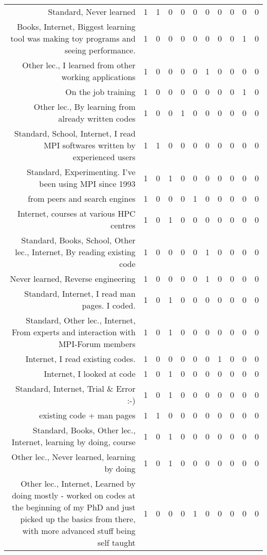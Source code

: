 {\begin{landscape}
\begin{longtable}[htb]{r|c|c|c|c|c|c|c|c|c|c}
{Standard, Never learned} & 1 & 1 & 0 & 0 & 0 & 0 & 0 & 0 & 0 & 0 \\%
{Books, Internet, Biggest learning tool was making toy programs and seeing performance.} & 1 & 0 & 0 & 0 & 0 & 0 & 0 & 0 & 1 & 0 \\%
{Other lec., I learned from other working applications} & 1 & 0 & 0 & 0 & 0 & 1 & 0 & 0 & 0 & 0 \\%
{On the job training} & 1 & 0 & 0 & 0 & 0 & 0 & 0 & 0 & 1 & 0 \\%
{Other lec., By learning from already written codes} & 1 & 0 & 0 & 1 & 0 & 0 & 0 & 0 & 0 & 0 \\%
{Standard, School, Internet, I read MPI softwares written by experienced users} & 1 & 1 & 0 & 0 & 0 & 0 & 0 & 0 & 0 & 0 \\%
{Standard, Experimenting. I've been using MPI since 1993} & 1 & 0 & 1 & 0 & 0 & 0 & 0 & 0 & 0 & 0 \\%
{from peers and search engines} & 1 & 0 & 0 & 0 & 1 & 0 & 0 & 0 & 0 & 0 \\%
{Internet, courses at various HPC centres} & 1 & 0 & 1 & 0 & 0 & 0 & 0 & 0 & 0 & 0 \\%
{Standard, Books, School, Other lec., Internet, By reading existing code} & 1 & 0 & 0 & 0 & 0 & 1 & 0 & 0 & 0 & 0 \\%
{Never learned, Reverse engineering} & 1 & 0 & 0 & 0 & 0 & 1 & 0 & 0 & 0 & 0 \\%
{Standard, Internet, I read man pages. I coded.} & 1 & 0 & 1 & 0 & 0 & 0 & 0 & 0 & 0 & 0 \\%
{Standard, Other lec., Internet, From experts and interaction with MPI-Forum members} & 1 & 0 & 1 & 0 & 0 & 0 & 0 & 0 & 0 & 0 \\%
{Internet, I read existing codes.} & 1 & 0 & 0 & 0 & 0 & 0 & 1 & 0 & 0 & 0 \\%
{Internet, I looked at code} & 1 & 0 & 1 & 0 & 0 & 0 & 0 & 0 & 0 & 0 \\%
{Standard, Internet, Trial \& Error :-)} & 1 & 0 & 1 & 0 & 0 & 0 & 0 & 0 & 0 & 0 \\%
{existing code + man pages} & 1 & 1 & 0 & 0 & 0 & 0 & 0 & 0 & 0 & 0 \\%
{Standard, Books, Other lec., Internet, learning by doing, course} & 1 & 0 & 1 & 0 & 0 & 0 & 0 & 0 & 0 & 0 \\%
{Other lec., Never learned, learning by doing} & 1 & 0 & 1 & 0 & 0 & 0 & 0 & 0 & 0 & 0 \\%
{Other lec., Internet, Learned by doing mostly - worked on codes at the beginning of my PhD and just picked up the basics from there, with more advanced stuff being self taught} & 1 & 0 & 0 & 0 & 1 & 0 & 0 & 0 & 0 & 0 \\%

\end{longtable}
\end{landscape}}
